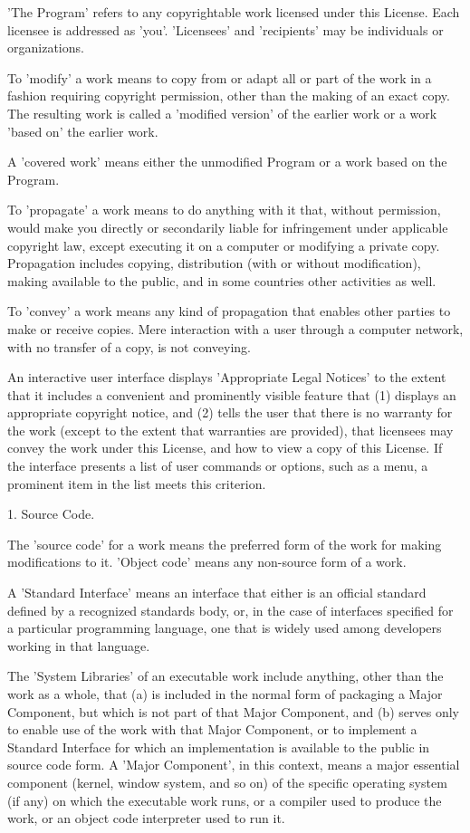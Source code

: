 \documentclass{article}
\begin{document}
  'The Program' refers to any copyrightable work licensed under this
License.  Each licensee is addressed as 'you'.  'Licensees' and
'recipients' may be individuals or organizations.

  To 'modify' a work means to copy from or adapt all or part of the work
in a fashion requiring copyright permission, other than the making of an
exact copy.  The resulting work is called a 'modified version' of the
earlier work or a work 'based on' the earlier work.

  A 'covered work' means either the unmodified Program or a work based
on the Program.

  To 'propagate' a work means to do anything with it that, without
permission, would make you directly or secondarily liable for
infringement under applicable copyright law, except executing it on a
computer or modifying a private copy.  Propagation includes copying,
distribution (with or without modification), making available to the
public, and in some countries other activities as well.

  To 'convey' a work means any kind of propagation that enables other
parties to make or receive copies.  Mere interaction with a user through
a computer network, with no transfer of a copy, is not conveying.

  An interactive user interface displays 'Appropriate Legal Notices'
to the extent that it includes a convenient and prominently visible
feature that (1) displays an appropriate copyright notice, and (2)
tells the user that there is no warranty for the work (except to the
extent that warranties are provided), that licensees may convey the
work under this License, and how to view a copy of this License.  If
the interface presents a list of user commands or options, such as a
menu, a prominent item in the list meets this criterion.

  1. Source Code.

  The 'source code' for a work means the preferred form of the work
for making modifications to it.  'Object code' means any non-source
form of a work.

  A 'Standard Interface' means an interface that either is an official
standard defined by a recognized standards body, or, in the case of
interfaces specified for a particular programming language, one that
is widely used among developers working in that language.

  The 'System Libraries' of an executable work include anything, other
than the work as a whole, that (a) is included in the normal form of
packaging a Major Component, but which is not part of that Major
Component, and (b) serves only to enable use of the work with that
Major Component, or to implement a Standard Interface for which an
implementation is available to the public in source code form.  A
'Major Component', in this context, means a major essential component
(kernel, window system, and so on) of the specific operating system
(if any) on which the executable work runs, or a compiler used to
produce the work, or an object code interpreter used to run it.
\end{document}
